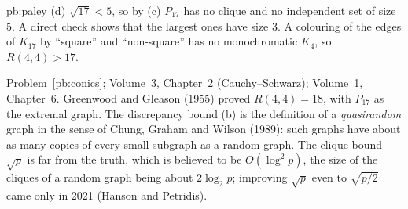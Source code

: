 \begin{solution}{pb:paley}
(d) $\sqrt{17}<5$, so by (c) $P_{17}$ has no clique and no independent set of size $5$. A direct check
shows that the largest ones have size $3$. A colouring of the edges of $K_{17}$ by ``square'' and
``non-square'' has no monochromatic $K_4$, so $R(4,4)>17$.

\tools Problem~\ref{pb:conics}; Volume~3, Chapter~2 (Cauchy--Schwarz); Volume~1, Chapter~6.
\leads Greenwood and Gleason (1955) proved $R(4,4)=18$, with $P_{17}$ as the extremal graph. The discrepancy bound (b) is the
definition of a \emph{quasirandom} graph in the sense of Chung, Graham and Wilson (1989): such graphs have about as many copies of
every small subgraph as a random graph. The clique bound $\sqrt p$ is far from the truth, which is believed to be $O(\log^2p)$,
the size of the cliques of a random graph being about $2\log_2p$; improving $\sqrt p$ even to $\sqrt{p/2}$ came only in 2021
(Hanson and Petridis).
\end{solution}

